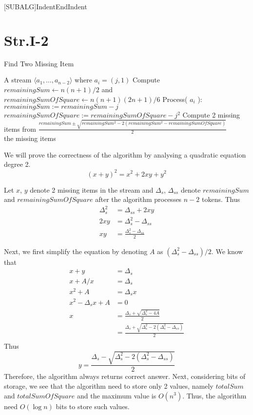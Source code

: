 [SUBALG]{Indent}{EndIndent}{}{\algorithmicend\ }%

\section*{Str.I-2}

\begin{algorithm}[h]
  \caption{Find Two Missing Item}
  \label{alg:find-2-missing-item}
  \begin{algorithmic}
      \Require A stream $\langle a_1, \dotsc, a_{n-2} \rangle$ where $a_i = (j,1)$
      \State Compute $remainingSum \gets n(n+1)/2$ and  $remainingSumOfSquare \gets n(n+1)(2n+1)/6$
      \State Process( $a_i $ ):
      		\Indent
     			\State $remainingSum := remainingSum - j$
			\State $remainingSumOfSquare := remainingSumOfSquare - j^2$
		\EndIndent
	\State Compute 2 missing items from $\frac{ remainingSum \pm \sqrt{ remainingSum^2 - 2( remainingSum^2 - remainingSumOfSquare ) } }{2}$\\
  \Return the missing items
\end{algorithmic}
\end{algorithm}

We will prove the correctness of the algorithm by analysing a quadratic equation degree 2. 
$$ (x+y)^2 = x^2 + 2xy + y^2 $$

Let $x$, $y$ denote 2 missing items in the stream and $\Delta_s$, $\Delta_{ss}$ denote $remainingSum$ and $remainingSumOfSquare$ after the algorithm processes $n-2$ tokens. Thus
\begin{align*}
	\Delta_s^2 &= \Delta_{ss} + 2xy \\
	2xy &= \Delta_s^2 - \Delta_{ss} \\
	xy &= \frac{\Delta_s^2 - \Delta_{ss}}{2}
\end{align*}

Next, we first simplify the equation by denoting $A$ as $(\Delta_s^2 - \Delta_{ss})/2$. We know that
\begin{align*}
	x+y &= \Delta_s \\
	x + A/x &= \Delta_s \\
	x^2+A  &= \Delta_s x\\
	x^2 - \Delta_s x + A &= 0 \\
	x &= \frac{\Delta_s + \sqrt{\Delta_s^2 - 4A}}{2} \\
	&= \frac{\Delta_s + \sqrt{\Delta_s^2 - 2(\Delta_s^2 - \Delta_{ss})}}{2}\\
\end{align*}
Thus
$$ 	y = \frac{\Delta_s - \sqrt{\Delta_s^2 - 2(\Delta_s^2 - \Delta_{ss})}}{2} $$
Therefore, the algorithm always returns correct answer. Next, considering bits of storage, we see that the algorithm need to store only 2 values, namely $totalSum$ and $totalSumOfSquare$ and the maximum value is $O(n^3)$. Thus, the algorithm need $O(\log n )$ bits to store such values.
